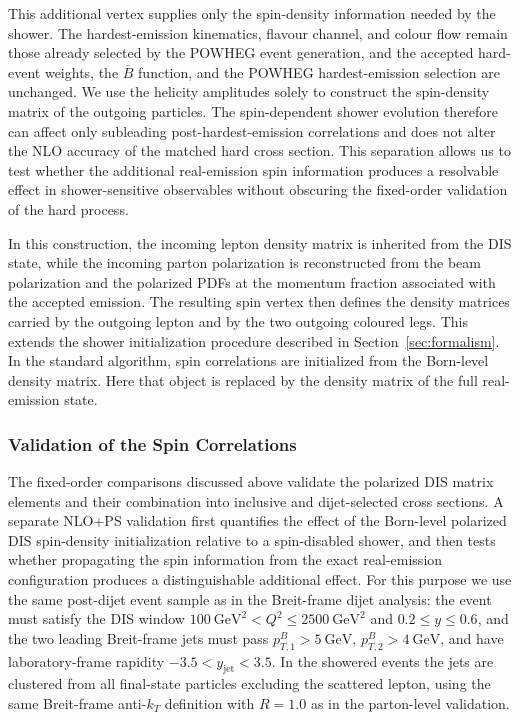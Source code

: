 \documentclass[a4paper,11pt]{article}
\begin{document}
This additional vertex supplies only the spin-density information needed by the
shower. The hardest-emission kinematics, flavour channel, and colour flow remain
those already selected by the POWHEG event generation, and the accepted
hard-event weights, the $\bar B$ function, and the POWHEG hardest-emission
selection are unchanged. We use the helicity amplitudes solely to construct the
spin-density matrix of the outgoing particles. The spin-dependent shower evolution therefore
can affect only subleading post-hardest-emission correlations and does not alter
the NLO accuracy of the matched hard cross section. This separation allows us
to test whether the additional real-emission spin information produces a
resolvable effect in shower-sensitive observables without obscuring the
fixed-order validation of the hard process.

In this construction, the incoming lepton density matrix is inherited from the
DIS state, while the incoming parton polarization is reconstructed from the beam
polarization and the polarized PDFs at the momentum fraction associated with
the accepted emission. The resulting spin vertex then defines the density
matrices carried by the outgoing lepton and by the two outgoing coloured legs.
This extends the shower initialization procedure described in
Section~\ref{sec:formalism}. In the standard algorithm, spin correlations are
initialized from the Born-level density matrix. Here that object is replaced by
the density matrix of the full real-emission state.

\subsubsection{Validation of the Spin Correlations}
The fixed-order comparisons discussed above validate the polarized DIS matrix
elements and their combination into inclusive and dijet-selected cross
sections. A separate NLO+PS validation first quantifies the effect of the
Born-level polarized DIS spin-density initialization relative to a spin-disabled
shower, and then tests whether propagating the spin information from the exact
real-emission configuration produces a distinguishable additional effect. For
this purpose we use the same post-dijet event sample as in the Breit-frame
dijet analysis: the event must satisfy the DIS window
$100~\mathrm{GeV}^2 < Q^2 \le 2500~\mathrm{GeV}^2$ and $0.2 \le y \le 0.6$, and the two
leading Breit-frame jets must pass
$p_{T,1}^{B}>5~\mathrm{GeV}$,
$p_{T,2}^{B}>4~\mathrm{GeV}$, and
have laboratory-frame rapidity $-3.5<y_{\mathrm{jet}}<3.5$. In the showered
events the jets are clustered from all final-state particles excluding the
scattered lepton, using the same Breit-frame anti-$k_T$ definition with
$R=1.0$ as in the parton-level validation.
\end{document}
